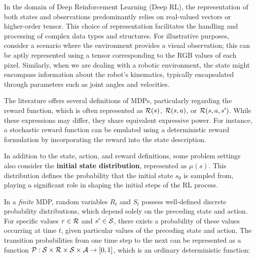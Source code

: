 

In the domain of Deep Reinforcement Learning (Deep RL), the representation of both states and observations predominantly relies on real-valued vectors or higher-order tensor. This choice of representation facilitates the handling and processing of complex data types and structures. For illustrative purposes, consider a scenario where the environment provides a visual observation; this can be aptly represented using a tensor corresponding to the RGB values of each pixel. Similarly, when we are dealing with a robotic environment, the state might encompass information about the robot's kinematics, typically encapsulated through parameters such as joint angles and velocities.



The literature offers several definitions of MDPs, particularly regarding the reward function, which is often represented as $\mathcal R(s)$, $\mathcal R(s,a)$, or $\mathcal R(s,a,s')$. While these expressions may differ, they share equivalent expressive power. For instance, a stochastic reward function can be emulated using a deterministic reward formulation by incorporating the reward into the state description.

In addition to the state, action, and reward definitions, some problem settings also consider the \textbf{initial state distribution}, represented as $\mu(s)$. This distribution defines the probability that the initial state $s_0$ is sampled from, playing a significant role in shaping the initial steps of the RL process.

In a \textit{finite} MDP, random variables $R_t$ and $S_t$ possess well-defined discrete probability distributions, which depend solely on the preceding state and action. For specific values $r \in \mathcal R$ and $s' \in \mathcal{S}$, there exists a probability of these values occurring at time $t$, given particular values of the preceding state and action. The transition probabilities from one time step to the next can be represented as a function $\mathcal P: \mathcal{S} \times \mathcal R \times 
\mathcal{S} \times \mathcal A \to [0,1]$, which is an ordinary deterministic function\cite{RL}:

